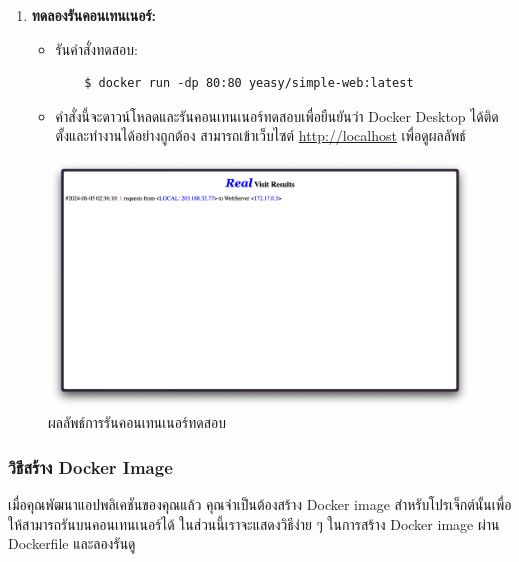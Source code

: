 \begin{enumerate}
      \item \textbf{ทดลองรันคอนเทนเนอร์:}
            \begin{itemize}
                  \item รันคำสั่งทดสอบ:
                        \begin{verbatim}
    $ docker run -dp 80:80 yeasy/simple-web:latest
            \end{verbatim}
                  \item คำสั่งนี้จะดาวน์โหลดและรันคอนเทนเนอร์ทดสอบเพื่อยืนยันว่า Docker Desktop ได้ติดตั้งและทำงานได้อย่างถูกต้อง สามารถเข้าเว็บไซต์ \url{http://localhost} เพื่อดูผลลัพธ์
            \end{itemize}
\end{enumerate}
\begin{figure}[ht]
      \begin{center}
            \includegraphics[scale=0.2]{images/simpleDockerRunResult.png}
      \end{center}
      \caption[ผลลัพธ์การรันคอนเทนเนอร์ทดสอบ]{ผลลัพธ์การรันคอนเทนเนอร์ทดสอบ}
\end{figure}

\clearpage
\subsubsection{วิธีสร้าง Docker Image}

เมื่อคุณพัฒนาแอปพลิเคชันของคุณแล้ว คุณจำเป็นต้องสร้าง Docker image สำหรับโปรเจ็กต์นั้นเพื่อให้สามารถรันบนคอนเทนเนอร์ได้ ในส่วนนี้เราจะแสดงวิธีง่าย ๆ ในการสร้าง Docker image ผ่าน Dockerfile และลองรันดู

